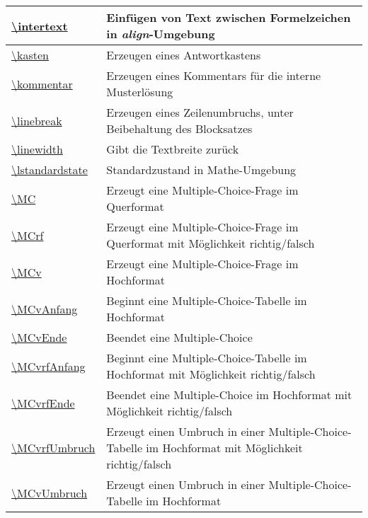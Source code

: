 \documentclass[./main.tex]{subfiles}
\begin{document}
\begin{tabularx}{\linewidth}{|l|X|}
    \hyperlink{intertext}{\textbackslash{}intertext}&Einf\"ugen von Text zwischen Formelzeichen in \textit{align}-Umgebung\\\hline
    \hyperlink{kasten}{\textbackslash{}kasten}&Erzeugen eines Antwortkastens\\\hline
    \hyperlink{kommentar}{\textbackslash{}kommentar}&Erzeugen eines Kommentars f\"ur die interne Musterl\"osung\\\hline
    \hyperlink{linebreak}{\textbackslash{}linebreak}&Erzeugen eines Zeilenumbruchs, unter Beibehaltung des Blocksatzes\\\hline
    \hyperlink{linewidth}{\textbackslash{}linewidth}&Gibt die Textbreite zur\"uck\\\hline
    \hyperlink{lstandardstate}{\textbackslash{}lstandardstate}&Standardzustand in Mathe-Umgebung\\\hline
    \hyperlink{MC}{\textbackslash{}MC}&Erzeugt eine Multiple-Choice-Frage im Querformat\\\hline
    \hyperlink{MCrf}{\textbackslash{}MCrf}&Erzeugt eine Multiple-Choice-Frage im Querformat mit M\"oglichkeit richtig/falsch\\\hline
    \hyperlink{MCv}{\textbackslash{}MCv}&Erzeugt eine Multiple-Choice-Frage im Hochformat\\\hline
    \hyperlink{MCvAnfang}{\textbackslash{}MCvAnfang}&Beginnt eine Multiple-Choice-Tabelle im Hochformat\\\hline
    \hyperlink{MCvEnde}{\textbackslash{}MCvEnde}&Beendet eine Multiple-Choice\\\hline
    \hyperlink{MCvrfAnfang}{\textbackslash{}MCvrfAnfang}&Beginnt eine Multiple-Choice-Tabelle im Hochformat mit M\"oglichkeit richtig/falsch\\\hline
    \hyperlink{MCvrfEnde}{\textbackslash{}MCvrfEnde}&Beendet eine Multiple-Choice im Hochformat mit M\"oglichkeit richtig/falsch\\\hline
    \hyperlink{MCvrfUmbruch}{\textbackslash{}MCvrfUmbruch}&Erzeugt einen Umbruch in einer Multiple-Choice-Tabelle im Hochformat mit M\"oglichkeit richtig/falsch\\\hline
    \hyperlink{MCvUmbruch}{\textbackslash{}MCvUmbruch}&Erzeugt einen Umbruch in einer Multiple-Choice-Tabelle im Hochformat\\\hline

\end{tabularx}
\end{document}
